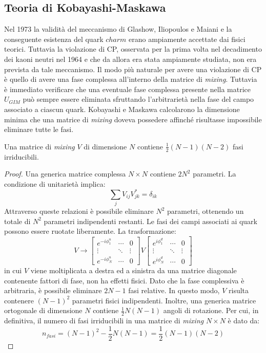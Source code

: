 \subsection{Teoria di Kobayashi-Maskawa}
\noindent
Nel 1973 la validità del meccanismo di Glashow, Iliopoulos e Maiani e la conseguente esistenza del quark $charm$ erano ampiamente accettate dai fisici
teorici. Tuttavia la violazione di CP, osservata per la prima volta nel decadimento dei kaoni neutri nel 1964 e che da allora
era stata ampiamente studiata, non era prevista da tale meccanismo.
Il modo più naturale per avere una violazione di CP è quello di avere una fase complessa all'interno della matrice di \emph{mixing}\cite{Kobayashi}.
Tuttavia è immediato verificare che una eventuale fase complessa presente nella matrice $U_{GIM}$ può sempre essere eliminata sfruttando 
l'arbitrarietà nella fase del campo associato a ciascun quark.
Kobayashi e Maskawa calcolarono la dimensione minima che una matrice di \emph{mixing} doveva possedere affinché risultasse impossibile eliminare
tutte le fasi.
\begin{teorema}
Una matrice di \emph{mixing} $V$ di dimensione $N$ contiene $\frac{1}{2}(N-1)(N-2)$ fasi irriducibili.
\end{teorema}
\begin{proof}
 Una generica matrice complessa $N × N$ contiene $2N^2$ parametri. La condizione di unitarietà implica:
\begin{equation}
 \sum_j V_{ij}V_{jk}^* = \delta_{ik}
\end{equation}
Attraverso queste relazioni è possibile eliminare $N^2$ parametri, ottenendo un totale di $N^2$ parametri indipendenti restanti.
Le fasi dei campi associati ai quark possono essere ruotate liberamente. La trasformazione:
\begin{equation}
 V \rightarrow \begin{bmatrix} e^{-i\phi_1^u} & \cdots & 0 \\ \vdots & \ddots & \vdots \\ e^{-i\phi_N^u} & \cdots & 0\end{bmatrix} V \begin{bmatrix} e^{i\phi_1^d} & \cdots & 0 \\ \vdots & \ddots & \vdots \\ e^{i\phi_N^d} & \cdots & 0\end{bmatrix}
\end{equation}
in cui $V$ viene moltiplicata a destra ed a sinistra da una matrice diagonale contenente fattori di fase, non ha effetti fisici.
Dato che la fase complessiva è arbitraria, è possibile eliminare $2N-1$ fasi relative. In questo modo, $V$ risulta contenere $(N-1)^2$ 
parametri fisici indipendenti.
Inoltre, una generica matrice ortogonale di dimensione $N$ contiene $\frac{1}{2}N(N-1)$ angoli di rotazione. Per cui, in definitiva, 
il numero di fasi irriducibili in una matrice di \emph{mixing} $N × N$ è dato da:
\begin{equation}
 n_{fasi} = (N-1)^2 - \frac{1}{2}N(N-1) = \frac{1}{2}(N-1)(N-2)
\end{equation}
\end{proof}
